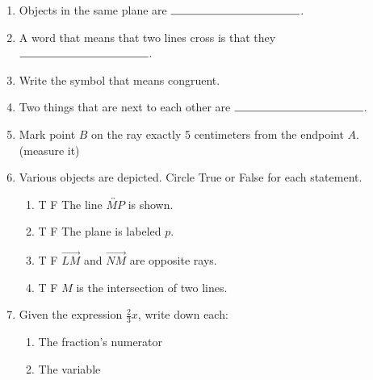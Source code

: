 \begin{enumerate}
\item Objects in the same plane are $\rule{4cm}{0.15mm}$. \bigskip

\item A word that means that two lines cross is that they $\rule{4cm}{0.15mm}$.  \bigskip

\item Write the symbol that means congruent.  \bigskip

\item Two things that are next to each other are $\rule{4cm}{0.15mm}$. \bigskip

\item Mark point $B$ on the ray exactly 5 centimeters from the endpoint $A$. (measure it) \par \bigskip
   \bigskip

\item Various objects are depicted. Circle True or False for each statement.
  \begin{multicols}{2}
    \begin{enumerate}
      \item T \quad F \quad The line $\overleftrightarrow{MP}$ is shown.
      \item T \quad F \quad The plane is labeled $p$.
      \item T \quad F \quad $\overrightarrow{LM}$ and $\overrightarrow{NM}$ are opposite rays.
      \item T \quad F \quad $M$ is the intersection of two lines.
    \end{enumerate}
  \end{multicols} \bigskip

\item Given the expression $\frac{2}{3}x$, write down each:
\begin{multicols*}{2}
  \begin{enumerate}
  \item The fraction's numerator
  \columnbreak
  \item The variable
\end{enumerate}
\end{multicols*}


\end{enumerate}
